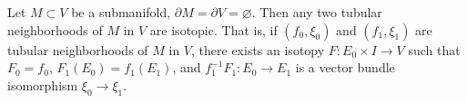 Let $M \subset V$ be a submanifold, $\partial M = \partial V = \varnothing$. Then any two tubular neighborhoods of $M$ in $V$ are isotopic. That is, if $(f_0, \xi_0)$ and $(f_1, \xi_1)$ are tubular neighborhoods of $M$ in $V$, there exists an isotopy $F: E_0 \times I \rightarrow V$ such that $F_0 = f_0$, $F_1(E_0) = f_1(E_1)$, and $f_1^{-1} F_1: E_0 \rightarrow E_1$ is a vector bundle isomorphism $\xi_0 \rightarrow \xi_1$.
